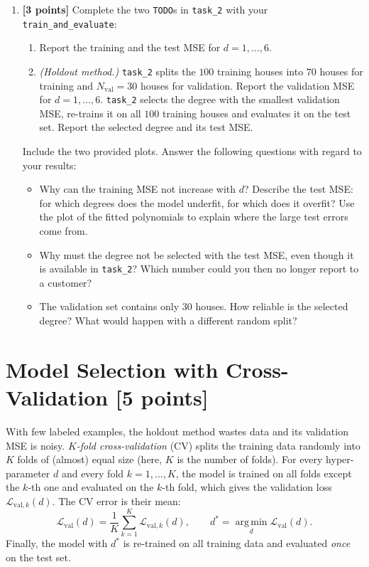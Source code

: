 \documentclass[hidelinks,10pt]{article}
\begin{document}
\begin{enumerate}
    \item \textbf{[3 points]} Complete the two \texttt{TODO}s in \texttt{task\_2} with your \texttt{train\_and\_evaluate}:
    \begin{enumerate}[label=(\alph*), itemsep=0.1em, topsep=0.2em]
        \item Report the training and the test MSE for $d = 1, \dots, 6$.
        \item \emph{(Holdout method.)} \texttt{task\_2} splits the $100$ training houses into $70$ houses for training and $N_{\mathrm{val}} = 30$ houses for validation. Report the validation MSE for $d = 1, \dots, 6$. \texttt{task\_2} selects the degree with the smallest validation MSE, re-trains it on all $100$ training houses and evaluates it on the test set. Report the selected degree and its test MSE.
    \end{enumerate}
    Include the two provided plots. Answer the following questions with regard to your results:
    \begin{itemize}
        \item[\textbf{Q2.3}] Why can the training MSE not increase with $d$? Describe the test MSE: for which degrees does the model underfit, for which does it overfit? Use the plot of the fitted polynomials to explain where the large test errors come from.
        \item[\textbf{Q2.4}] Why must the degree not be selected with the test MSE, even though it is available in \texttt{task\_2}? Which number could you then no longer report to a customer?
        \item[\textbf{Q2.5}] The validation set contains only $30$ houses. How reliable is the selected degree? What would happen with a different random split?
    \end{itemize}
\end{enumerate}

\section{Model Selection with Cross-Validation [5 points]}

With few labeled examples, the holdout method wastes data and its validation MSE is noisy. \emph{$K$-fold cross-validation} (CV) splits the training data randomly into $K$ folds of (almost) equal size (here, $K$ is the number of folds). For every hyper-parameter $d$ and every fold $k = 1, \dots, K$, the model is trained on all folds except the $k$-th one and evaluated on the $k$-th fold, which gives the validation loss $\mathcal{L}_{\mathrm{val},k}(d)$. The CV error is their mean:
\begin{equation}
    \mathcal{L}_{\mathrm{val}}(d) = \frac{1}{K}\sum_{k=1}^{K}\mathcal{L}_{\mathrm{val},k}(d), \qquad d^* = \operatorname*{arg\,min}_d \mathcal{L}_{\mathrm{val}}(d).
    \label{eq:cv}
\end{equation}
Finally, the model with $d^*$ is re-trained on all training data and evaluated \emph{once} on the test set.
\end{document}

